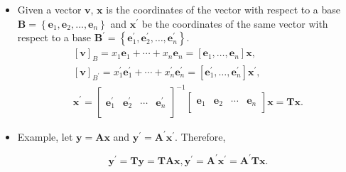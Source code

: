 \documentclass[12pt,thmsa]{article}
\begin{document}
\begin{itemize}
	\item Given a vector \(\boldsymbol{v}\), \(\boldsymbol{x}\) is the coordinates of the vector with respect to a base \(\boldsymbol{B} =\left\{\boldsymbol{e}_{1}, \boldsymbol{e}_{2}, \ldots, \boldsymbol{e}_{n}\right\}\) and \(\boldsymbol{x}^{\prime}\) be the coordinates of the same vector with respect to a base \( \boldsymbol{B}^{\prime} = \left\{\boldsymbol{e}_{1}^{\prime}, \boldsymbol{e}_{2}^{\prime}, \ldots, \boldsymbol{e}_{n}^{\prime}\right\}\).
	\begin{equation*}
		\begin{gathered}
		\left[ \boldsymbol{v} \right]_{B}=x_1 \boldsymbol{e}_1+\cdots+x_n \boldsymbol{e}_n=\left[\boldsymbol{e}_1, \ldots, \boldsymbol{e}_n\right] \boldsymbol{x},  \\
		\left[ \boldsymbol{v} \right]_{B^{\prime}}=x_1^{\prime} \boldsymbol{e}_1^{\prime}+\cdots+x_n^{\prime} \boldsymbol{e}_n^{\prime} = \left[\boldsymbol{e}_1^{\prime}, \ldots, \boldsymbol{e}_n^{\prime}\right] \boldsymbol{x}^{\prime}, \\
		\boldsymbol{x}^{\prime} = \left[ \begin{array}{cccc}
			 &  &   &  \\
			\boldsymbol{e}_1^{\prime} & \boldsymbol{e}_2^{\prime} & \cdots & \boldsymbol{e}_n^{\prime} \\
			 &  &   &  
		\end{array} \right]^{-1}
		\left[ \begin{array}{cccc}
			 &  &   &  \\
			\boldsymbol{e}_1 & \boldsymbol{e}_2 & \cdots & \boldsymbol{e}_n \\
			 &  &   &  
		\end{array} \right] \boldsymbol{x}=\boldsymbol{T} \boldsymbol{x}.
		\end{gathered}
	\end{equation*}

	\item Example, let \(\boldsymbol{y}=\boldsymbol{A} \boldsymbol{x}\) and \(\boldsymbol{y}^{\prime}=\boldsymbol{A}^{\prime} \boldsymbol{x}^{\prime}\). Therefore,
	
	\begin{equation*}
		\boldsymbol{y}^{\prime}=\boldsymbol{T} \boldsymbol{y}=\boldsymbol{T} \boldsymbol{A} \boldsymbol{x}, 	\boldsymbol{y}^{\prime}=\boldsymbol{A}^{\prime} \boldsymbol{x}^{\prime}=\boldsymbol{A}^{\prime} \boldsymbol{T} \boldsymbol{x}.
	\end{equation*}
	

\end{itemize}
\end{document}
